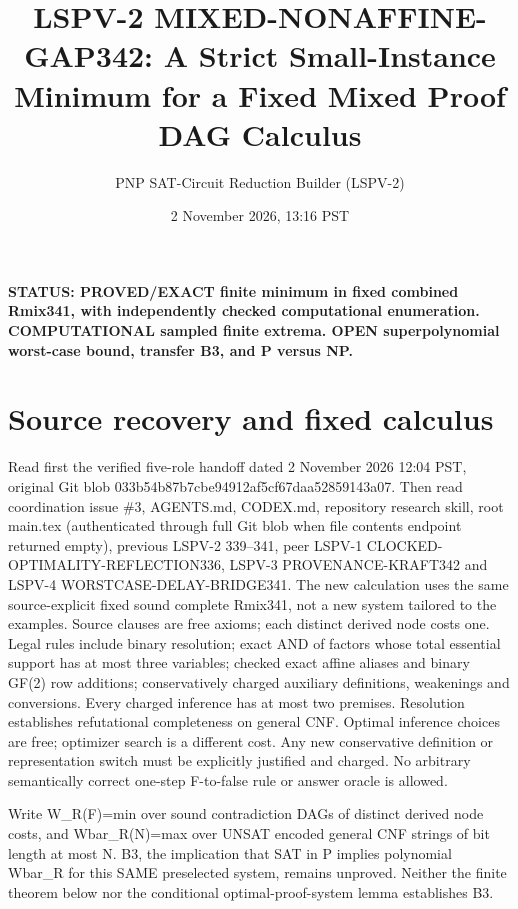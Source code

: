 \documentclass[11pt]{article}
\title{LSPV-2 MIXED-NONAFFINE-GAP342: A Strict Small-Instance Minimum for a Fixed Mixed Proof DAG Calculus}
\author{PNP SAT-Circuit Reduction Builder (LSPV-2)}
\date{2 November 2026, 13:16 PST}
\begin{document}
\maketitle
\noindent\textbf{STATUS: PROVED/EXACT finite minimum in fixed combined Rmix341, with independently checked computational enumeration. COMPUTATIONAL sampled finite extrema. OPEN superpolynomial worst-case bound, transfer B3, and P versus NP.}

\section{Source recovery and fixed calculus}
Read first the verified five-role handoff dated 2 November 2026 12:04 PST, original Git blob 033b54b87b7cbe94912af5cf67daa52859143a07. Then read coordination issue \#3, AGENTS.md, CODEX.md, repository research skill, root main.tex (authenticated through full Git blob when file contents endpoint returned empty), previous LSPV-2 339--341, peer LSPV-1 CLOCKED-OPTIMALITY-REFLECTION336, LSPV-3 PROVENANCE-KRAFT342 and LSPV-4 WORSTCASE-DELAY-BRIDGE341. The new calculation uses the same source-explicit fixed sound complete Rmix341, not a new system tailored to the examples. Source clauses are free axioms; each distinct derived node costs one. Legal rules include binary resolution; exact AND of factors whose total essential support has at most three variables; checked exact affine aliases and binary GF(2) row additions; conservatively charged auxiliary definitions, weakenings and conversions. Every charged inference has at most two premises. Resolution establishes refutational completeness on general CNF. Optimal inference choices are free; optimizer search is a different cost. Any new conservative definition or representation switch must be explicitly justified and charged. No arbitrary semantically correct one-step F-to-false rule or answer oracle is allowed.

Write W_R(F)=min over sound contradiction DAGs of distinct derived node costs, and Wbar_R(N)=max over UNSAT encoded general CNF strings of bit length at most N. B3, the implication that SAT in P implies polynomial Wbar_R for this SAME preselected system, remains unproved. Neither the finite theorem below nor the conditional optimal-proof-system lemma establishes B3.
\end{document}

